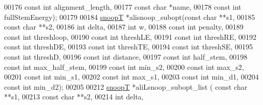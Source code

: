 \begin{DoxyCode}
00176                       \textcolor{keyword}{const} \textcolor{keywordtype}{int} alignment\_length,
00177                       \textcolor{keyword}{const} \textcolor{keywordtype}{char} *name,
00178           \textcolor{keyword}{const} \textcolor{keywordtype}{int} fullStemEnergy);
00179 
00184 \hyperlink{group__data__structures_structsnoopT}{snoopT} *alisnoop\_subopt(\textcolor{keyword}{const} \textcolor{keywordtype}{char} **s1,
00185                         \textcolor{keyword}{const} \textcolor{keywordtype}{char} **s2,
00186                         \textcolor{keywordtype}{int} delta,
00187                         \textcolor{keywordtype}{int} w,
00188                         \textcolor{keyword}{const} \textcolor{keywordtype}{int} penalty,
00189                         \textcolor{keyword}{const} \textcolor{keywordtype}{int} threshloop, 
00190                         \textcolor{keyword}{const} \textcolor{keywordtype}{int} threshLE,
00191                         \textcolor{keyword}{const} \textcolor{keywordtype}{int} threshRE,
00192                         \textcolor{keyword}{const} \textcolor{keywordtype}{int} threshDE,
00193                         \textcolor{keyword}{const} \textcolor{keywordtype}{int} threshTE,
00194                         \textcolor{keyword}{const} \textcolor{keywordtype}{int} threshSE,
00195                         \textcolor{keyword}{const} \textcolor{keywordtype}{int} threshD,
00196                         \textcolor{keyword}{const} \textcolor{keywordtype}{int} distance,
00197                         \textcolor{keyword}{const} \textcolor{keywordtype}{int} half\_stem,
00198                         \textcolor{keyword}{const} \textcolor{keywordtype}{int} max\_half\_stem,
00199                         \textcolor{keyword}{const} \textcolor{keywordtype}{int} min\_s2,
00200                         \textcolor{keyword}{const} \textcolor{keywordtype}{int} max\_s2,
00201                         \textcolor{keyword}{const} \textcolor{keywordtype}{int} min\_s1,
00202                         \textcolor{keyword}{const} \textcolor{keywordtype}{int} max\_s1,
00203                         \textcolor{keyword}{const} \textcolor{keywordtype}{int} min\_d1,
00204                         \textcolor{keyword}{const} \textcolor{keywordtype}{int} min\_d2);
00205 
00212 \hyperlink{group__data__structures_structsnoopT}{snoopT} *aliLsnoop\_subopt\_list ( \textcolor{keyword}{const} \textcolor{keywordtype}{char} **s1,
00213                                 \textcolor{keyword}{const} \textcolor{keywordtype}{char} **s2,
00214                                 \textcolor{keywordtype}{int} delta,

\end{DoxyCode}
